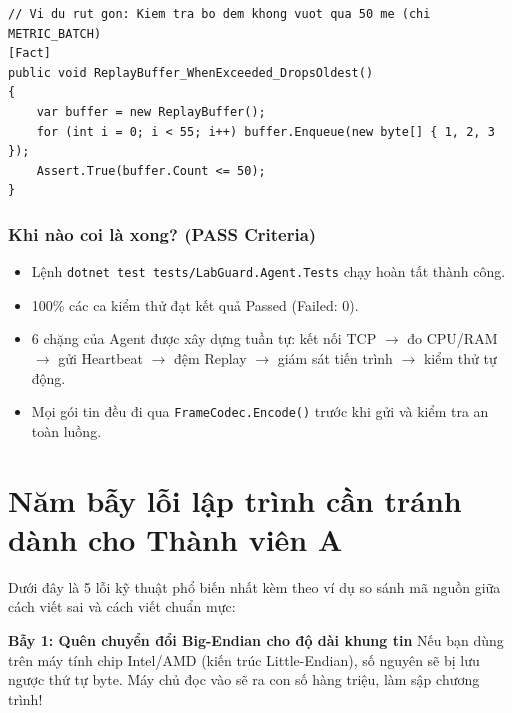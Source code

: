 \documentclass[12pt,a4paper]{article}
\begin{document}
\begin{lstlisting}[language=CSharp, caption={Ví dụ rút gọn: Bài kiểm thử đơn vị cho bộ đệm ReplayBuffer}]
// Vi du rut gon: Kiem tra bo dem khong vuot qua 50 me (chi METRIC_BATCH)
[Fact]
public void ReplayBuffer_WhenExceeded_DropsOldest()
{
    var buffer = new ReplayBuffer();
    for (int i = 0; i < 55; i++) buffer.Enqueue(new byte[] { 1, 2, 3 });
    Assert.True(buffer.Count <= 50);
}
\end{lstlisting}

\subsubsection{Khi nào coi là xong? (PASS Criteria)}
\begin{itemize}
  \item Lệnh \texttt{dotnet test tests/LabGuard.Agent.Tests} chạy hoàn tất thành công.
  \item 100\% các ca kiểm thử đạt kết quả Passed (Failed: 0).
\end{itemize}

\begin{takeawaybox}
\begin{itemize}[leftmargin=1.5em, itemsep=1pt]
  \item 6 chặng của Agent được xây dựng tuần tự: kết nối TCP $\rightarrow$ đo CPU/RAM $\rightarrow$ gửi Heartbeat $\rightarrow$ đệm Replay $\rightarrow$ giám sát tiến trình $\rightarrow$ kiểm thử tự động.
  \item Mọi gói tin đều đi qua \texttt{FrameCodec.Encode()} trước khi gửi và kiểm tra an toàn luồng.
\end{itemize}
\end{takeawaybox}

\section{Năm bẫy lỗi lập trình cần tránh dành cho Thành viên A}

Dưới đây là 5 lỗi kỹ thuật phổ biến nhất kèm theo ví dụ so sánh mã nguồn giữa cách viết sai và cách viết chuẩn mực:

\begin{pitfallbox}
\textbf{Bẫy 1: Quên chuyển đổi Big-Endian cho độ dài khung tin}
\newline Nếu bạn dùng  trên máy tính chip Intel/AMD (kiến trúc Little-Endian), số nguyên sẽ bị lưu ngược thứ tự byte. Máy chủ đọc vào sẽ ra con số hàng triệu, làm sập chương trình!
\end{pitfallbox}
\end{document}
